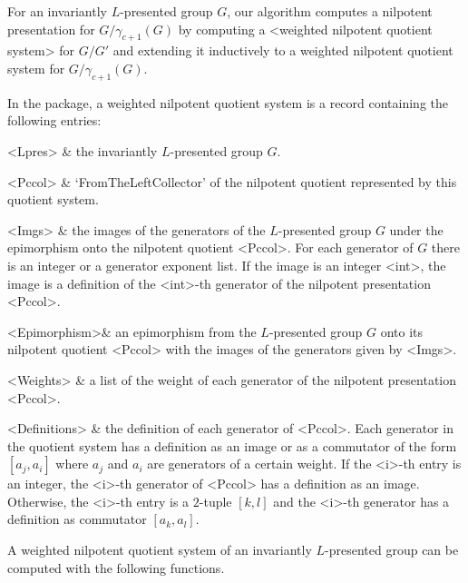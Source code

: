 


For an invariantly $L$-presented group $G$, our algorithm computes a
nilpotent presentation for $G/\gamma_{c+1}(G)$ by computing a <weighted
nilpotent quotient system> for $G/G'$ and extending it inductively to
a weighted nilpotent quotient system for $G/\gamma_{c+1}(G)$.

In the {\NQL} package, a weighted nilpotent quotient system is a record
containing the following entries:

\beginitems
<Lpres> & the invariantly $L$-presented group $G$.

<Pccol> & `FromTheLeftCollector' of the nilpotent quotient represented by this 
	  quotient system.

<Imgs>  & the images of the generators of the $L$-presented group $G$ under
	  the epimorphism onto the nilpotent quotient <Pccol>. For
	  each generator of $G$ there is an integer or a generator
	  exponent list. If the image is an integer <int>, the image
	  is a definition of the <int>-th generator of the nilpotent
	  presentation <Pccol>.

<Epimorphism>& an epimorphism from the $L$-presented group $G$ onto its 
	       nilpotent quotient <Pccol> with the images of the generators
	       given by <Imgs>.

<Weights> & a list of the weight of each generator of the nilpotent
            presentation <Pccol>.

<Definitions>
       & the definition of each generator of <Pccol>. Each generator in the 
	 quotient system has a definition as an image or as a commutator
	 of the form $[a_j,a_i]$ where $a_j$ and $a_i$ are generators of
	 a certain weight. If the <i>-th entry is an integer, the <i>-th
	 generator of <Pccol> has a definition as an image. Otherwise,
	 the <i>-th entry is a $2$-tuple $[k,l]$ and the <i>-th generator
	 has a definition as commutator $[a_k,a_l]$.
\enditems

A weighted nilpotent quotient system of an invariantly $L$-presented group 
can be computed with the following functions. 

